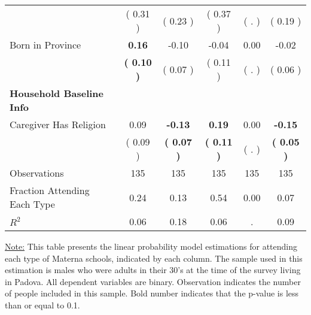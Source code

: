 \begin{table}[H]
{\begin{tabular}{lccccc}
\quad  & (     0.31 ) & (     0.23 )  & (     0.37 )  & (        . ) & (     0.19 ) \\
\quad Born in Province & \textbf{     0.16} &     -0.10 &     -0.04 &      0.00 &     -0.02 \\
\quad  & \textbf{(     0.10 )} & (     0.07 )  & (     0.11 )  & (        . ) & (     0.06 ) \\
\midrule
\textbf{Household Baseline Info} \\
\quad Caregiver Has Religion &      0.09 & \textbf{    -0.13} & \textbf{     0.19} &      0.00 & \textbf{    -0.15} \\
\quad  & (     0.09 ) & \textbf{(     0.07 )}  & \textbf{(     0.11 )}  & (        . ) & \textbf{(     0.05 )} \\
\midrule
Observations & 135 & 135 & 135 & 135 & 135 \\
Fraction Attending Each Type &      0.24 &      0.13 &      0.54 &      0.00 &      0.07 \\
\midrule
$ R^2$ &      0.06 &      0.18 &      0.06 &         . &      0.09 \\
\bottomrule
\end{tabular}}
\end{table}
\begin{footnotesize}
\noindent\underline{Note:} This table presents the linear probability model estimations for attending each type of Materna schools, indicated by each column. The sample used in this estimation is males who were adults in their 30's at the time of the survey living in Padova. All dependent variables are binary. Observation indicates the number of people included in this sample. Bold number indicates that the p-value is less than or equal to 0.1.
\end{footnotesize}
